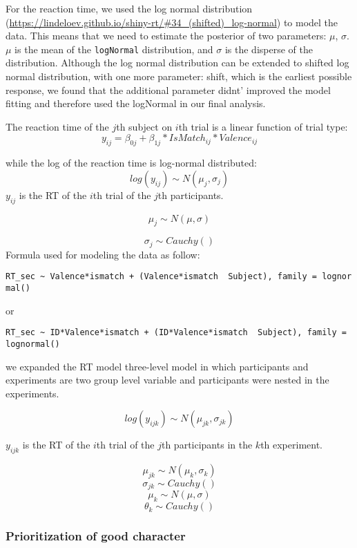 \documentclass[
  man]{apa6}
\begin{document}
For the reaction time, we used the log normal distribution (\url{https://lindeloev.github.io/shiny-rt/\#34_(shifted)_log-normal}) to model the data. This means that we need to estimate the posterior of two parameters: \(\mu\), \(\sigma\). \(\mu\) is the mean of the \texttt{logNormal} distribution, and \(\sigma\) is the disperse of the distribution. Although the log normal distribution can be extended to shifted log normal distribution, with one more parameter: shift, which is the earliest possible response, we found that the additional parameter didnt' improved the model fitting and therefore used the logNormal in our final analysis.

The reaction time of the \(j\)th subject on \(i\)th trial is a linear function of trial type: \[y_{ij} = \beta_{0j} + \beta_{1j}*IsMatch_{ij} * Valence_{ij}\]

while the log of the reaction time is log-normal distributed:
\[ log(y_{ij}) \sim N(\mu_{j}, \sigma_{j})\]
\(y_{ij}\) is the RT of the \(i\)th trial of the \(j\)th participants.

\[\mu_{j} \sim N(\mu, \sigma)\]

\[\sigma_{j} \sim Cauchy()\]
Formula used for modeling the data as follow:

\texttt{RT\_sec\ \textasciitilde{}\ Valence*ismatch\ +\ (Valence*ismatch\ \textbar{}\ Subject),\ family\ =\ lognormal()}

or

\texttt{RT\_sec\ \textasciitilde{}\ ID*Valence*ismatch\ +\ (ID*Valence*ismatch\ \textbar{}\ Subject),\ family\ =\ lognormal()}

we expanded the RT model three-level model in which participants and experiments are two group level variable and participants were nested in the experiments.

\[ log(y_{ijk}) \sim N(\mu_{jk}, \sigma_{jk})\]

\(y_{ijk}\) is the RT of the \(i\)th trial of the \(j\)th participants in the \(k\)th experiment.

\[\mu_{jk} \sim N(\mu_{k}, \sigma_{k})\]
\[\sigma_{jk} \sim Cauchy()\]
\[\mu_{k} \sim N(\mu, \sigma)\]
\[\theta_{k} \sim Cauchy()\]

\hypertarget{prioritization-of-good-character}{%
\subsubsection{Prioritization of good character}\label{prioritization-of-good-character}}
\end{document}
